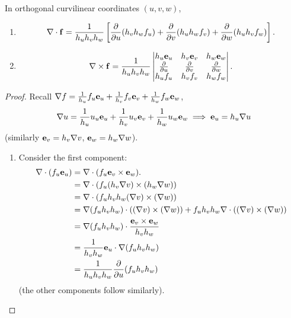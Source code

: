 \documentclass[10pt, a4paper]{article}
\begin{document}
\begin{proposition}
    In orthogonal curvilinear coordinates
    $(u, v, w)$,
    \begin{enumerate}[label = (\arabic*)]
        \item
        \[
        \mathbf{\nabla} \cdot \mathbf{f} = \frac{1}{h_uh_vh_w}\left[\frac{\partial }{\partial u}(h_vh_wf_u) + \frac{\partial }{\partial v}(h_uh_wf_v) + \frac{\partial }{\partial w}(h_uh_vf_w)\right].
        \]

        \item
        \[
        \mathbf{\nabla} \times \mathbf{f} = \frac{1}{h_uh_vh_w}\begin{vmatrix}
            h_u\mathbf{e}_u & h_v\mathbf{e}_v & h_w\mathbf{e}_w \\
            \frac{\partial }{\partial u} & \frac{\partial }{\partial v} & \frac{\partial }{\partial w} \\
            h_uf_u & h_vf_v & h_wf_w
        \end{vmatrix}.
        \]
    \end{enumerate}

    \begin{proof}
        Recall $\mathbf{\nabla} f = \frac{1}{h_u}f_u\mathbf{e}_u + \frac{1}{h_v}f_v\mathbf{e}_v + \frac{1}{h_w}f_w\mathbf{e}_w$,
        \[
        \mathbf{\nabla} u = \frac{1}{h_u}u_u\mathbf{e}_u + \frac{1}{h_v}u_v\mathbf{e}_v + \frac{1}{h_w}u_w\mathbf{e}_w \implies \mathbf{e}_u = h_u\mathbf{\nabla} u
        \]
        (similarly $\mathbf{e}_v = h_v\mathbf{\nabla} v$,
        $\mathbf{e}_w = h_w\mathbf{\nabla} w$).
        
        \begin{enumerate}[label = (\arabic*)]
            \item Consider the first component:
            \begin{align*}
                \mathbf{\nabla} \cdot (f_u\mathbf{e}_u) &= \mathbf{\nabla} \cdot (f_u\mathbf{e}_v \times \mathbf{e}_w). \\
                &= \mathbf{\nabla} \cdot (f_u(h_v\mathbf{\nabla} v) \times (h_w\mathbf{\nabla} w)) \\
                &= \mathbf{\nabla} \cdot (f_uh_vh_w (\mathbf{\nabla} v)\times(\mathbf{\nabla} w)) \\
                &= \mathbf{\nabla}(f_uh_vh_w) \cdot ((\mathbf{\nabla} v) \times (\mathbf{\nabla} w)) + f_uh_vh_w\mathbf{\nabla} \cdot ((\mathbf{\nabla} v) \times (\mathbf{\nabla} w)) \\
                &= \mathbf{\nabla}(f_uh_vh_w)\cdot\frac{\mathbf{e}_v \times \mathbf{e}_w}{h_vh_w} \\
                &= \frac{1}{h_vh_w}\mathbf{e}_u\cdot\mathbf{\nabla}(f_uh_vh_w) \\
                &= \frac{1}{h_uh_vh_w}\frac{\partial }{\partial u}(f_uh_vh_w)
            \end{align*}
            (the other components follow similarly).


\end{enumerate}
\end{proof}
\end{proposition}
\end{document}
